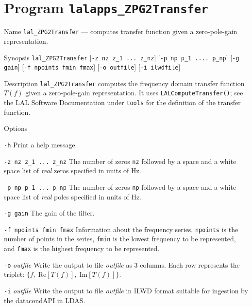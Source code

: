 \section{Program \texttt{lalapps\_ZPG2Transfer}}
\label{program:lalapps-ZPG2transfer}

\begin{entry}

\item[Name]
\verb$lal_ZPG2Transfer$ --- computes transfer function given a
zero-pole-gain representation. 

\item[Synopsis]
\verb$lal_ZPG2Transfer$ [\verb$-z nz z_1 ... z_nz$] [\verb$-p np p_1 .... p_np$] 
                         [\verb$-g gain$] [\verb$-f npoints fmin fmax$]
                         [\verb$-o outfile$] [\verb$-i ilwdfile$]
                         
\item[Description]
\verb$lal_ZPG2Transfer$ computes the frequency domain transfer
function $T(f)$ given a zero-pole-gain representation.   It uses
\verb$LALComputeTransfer()$;  see the LAL Software Documentation under
\texttt{tools} for the definition of the transfer function.

\item[Options]\leavevmode
\begin{entry}
\item[\texttt{-h}]
Print a help message.
\item[\texttt{-z nz z\_1 ... z\_nz}] 
The number of zeros \verb$nz$ followed
by a space and a white space list of \emph{real} zeros specified in units of Hz.
\item[\texttt{-p np p\_1 ... p\_np}] 
The number of zeros \verb$np$ followed
by a space and a white space list of \emph{real} poles specified in units of Hz.
\item[\texttt{-g gain}] 
The gain of the filter.
\item[\texttt{-f npoints fmin fmax}] 
Information about the frequency series.  \verb$npoints$ is the number
of points in the series,  \verb$fmin$ is the lowest frequency to be
represented,  and \verb$fmax$ is the highest frequency to be
represented.   
\item[\texttt{-o} \textit{outfile}]
Write the output to file \textit{outfile} as 3 columns.  Each row
represents the triplet: $\{f,\; \textrm{Re}[T(f)],\; \textrm{Im}[T(f)]\}$.
\item[\texttt{-i} \textit{outfile}]
Write the output to file \textit{outfile} in ILWD format suitable for
ingestion by the datacondAPI in LDAS.
\end{entry}


\end{entry}
